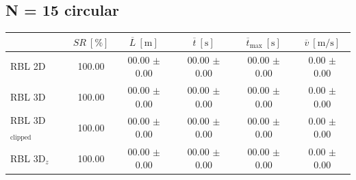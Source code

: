         \subsection{N = 15 circular}
        \begin{table}[H]
            \centering
            \renewcommand{\arraystretch}{1.2}
            \begin{tabular}{|l|c|c|c|c|c|}
            \hline
                                        & \( SR \ [\%] \) & \( \overline{L} \ [\mathrm{m}] \) & \( \overline{t} \ [\mathrm{s}] \) & \( \overline{t}_{\text{max}} \ [\mathrm{s}] \) & \( \overline{v} \ [\mathrm{m/s}] \)     \\ \hline
            RBL 2D                      & 100.00          & 00.00 $\pm$ 0.00                  & 00.00 $\pm$ 0.00                  & 00.00 $\pm$ 0.00                               & 0.00 $\pm$ 0.00                         \\ \hline
            RBL 3D                      & 100.00          & 00.00 $\pm$ 0.00                  & 00.00 $\pm$ 0.00                  & 00.00 $\pm$ 0.00                               & 0.00 $\pm$ 0.00                         \\ \hline
            RBL 3D\(_{\text{clipped}}\) & 100.00          & 00.00 $\pm$ 0.00                  & 00.00 $\pm$ 0.00                  & 00.00 $\pm$ 0.00                               & 0.00 $\pm$ 0.00                         \\ \hline
            RBL 3D\(_z\)                & 100.00          & 00.00 $\pm$ 0.00                  & 00.00 $\pm$ 0.00                  & 00.00 $\pm$ 0.00                               & 0.00 $\pm$ 0.00                         \\ \hline
            \end{tabular}
        \end{table}
    
